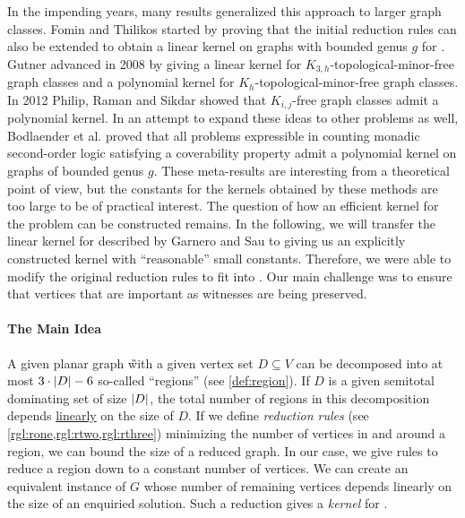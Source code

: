 In the impending years, many results generalized this approach to larger graph classes. Fomin and Thilikos \cite{Fomin2004} started by proving that the initial reduction rules \cite{Alber2004} can also be extended to obtain a linear kernel on graphs with bounded genus $g$ for \dom.
Gutner \cite{Gutner2009} advanced in 2008 by giving a linear kernel for $K_{3,h}$-topological-minor-free graph classes and a polynomial kernel for $K_h$-topological-minor-free graph classes. 
In 2012 Philip, Raman and Sikdar \cite{Philip2012} showed that $K_{i,j}$-free graph classes admit a polynomial kernel. 
In an attempt to expand these ideas to other problems as well, Bodlaender et al. \cite{Bodlaender2016} proved that all problems expressible in counting monadic second-order logic satisfying a coverability property admit a polynomial kernel on graphs of bounded genus $g$. These meta-results are interesting from a theoretical point of view, but the constants for the kernels obtained by these methods are too large to be of practical interest. 
The question of how an efficient kernel for the \psdom problem can be constructed remains. In the following, we will transfer the linear kernel for \ptdom described by Garnero and Sau \cite[arXiv v2]{Garnero2018} to \psdom giving us an explicitly constructed kernel with ``reasonable'' small constants. Therefore, we were able to modify the original reduction rules to fit into \psdom. Our main challenge was to ensure that vertices that are important as witnesses are being preserved. 

 \paragraph{The Main Idea} A given planar graph \G with a given vertex set $D \subseteq V$ can be decomposed into at most $3 \cdot \abs{D} -6$ so-called ``regions'' (see \cref{def:region}). If $D$ is a given semitotal dominating set of size $\abs{D}$, the total number of regions in this decomposition depends \underline{linearly} on the size of $D$. If we define \textit{reduction rules} (see \cref{rgl:rone,rgl:rtwo,rgl:rthree})  minimizing the number of vertices in and around a region, we can bound the size of a reduced graph. In our case, we give rules to reduce a region down to a constant number of vertices. We can create an equivalent instance of $G$ whose number of remaining vertices depends linearly on the size of an enquiried solution. Such a reduction gives a \textit{kernel} for \psdom.


